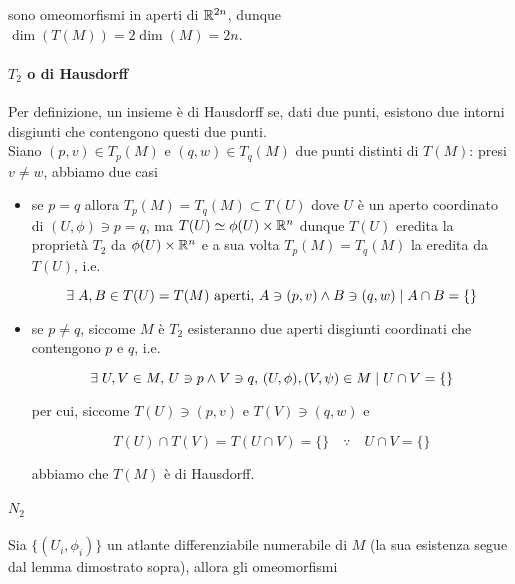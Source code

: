 sono omeomorfismi in aperti di $ \mathbb{R}^{2n} $, dunque $ \dim(T(M)) = 2 \dim(M) = 2n $.

\paragraph{$ T_{2} $ o di Hausdorff}

Per definizione, un insieme è di Hausdorff se, dati due punti, esistono due intorni disgiunti che contengono questi due punti.\\
Siano $ (p,v) \in T_{p}(M) $ e $ (q,w) \in T_{q}(M) $ due punti distinti di $ T(M) $: presi $ v \neq w $, abbiamo due casi

\begin{itemize}
	\item se $ p = q $ allora $ T_{p}(M) = T_{q}(M) \subset T(U) $ dove $ U $ è un aperto coordinato di $ (U,\phi) \ni p=q $, ma $ T(U) \simeq \phi(U) \times \mathbb{R}^{n} $ dunque $ T(U) $ eredita la proprietà $ T_{2} $ da $ \phi(U) \times \mathbb{R}^{n} $ e a sua volta $ T_{p}(M) = T_{q}(M) $ la eredita da $ T(U) $, i.e.
	
	\begin{equation}
		\exists \; A,B \in T(U) = T(M) \text{ aperti}, \, A \ni (p,v) \wedge B \ni (q,w) \mid A \cap B = \{\}
	\end{equation}
	
	\item se $ p \neq q $, siccome $ M $ è $ T_{2} $ esisteranno due aperti disgiunti coordinati che contengono $ p $ e $ q $, i.e.
	
	\begin{equation}
		\exists \; U,V \in M, \, U \ni p \wedge V \ni q, \, (U,\phi),(V,\psi) \in M \mid U \cap V = \{\}
	\end{equation}

	per cui, siccome $ T(U) \ni (p,v) $ e $ T(V) \ni (q,w) $ e
	
	\begin{equation}
		T(U) \cap T(V) = T(U \cap V) = \{\} \quad \because \quad U \cap V = \{\}
	\end{equation}

	abbiamo che $ T(M) $ è di Hausdorff.
\end{itemize}

\paragraph{$ N_{2} $}

Sia $ \{(U_{i},\phi_{i})\} $ un atlante differenziabile numerabile di $ M $ (la sua esistenza segue dal lemma dimostrato sopra), allora gli omeomorfismi

